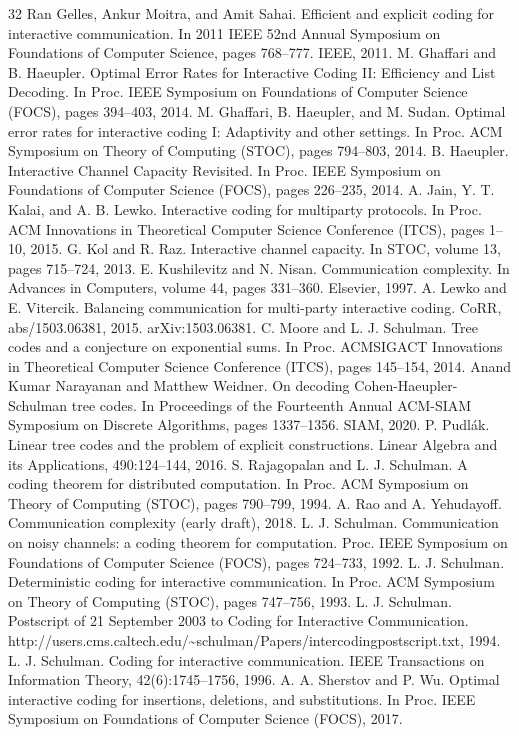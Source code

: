 \documentclass[10pt,a4paper]{article}
\begin{document}
\begin{thebibliography}{32}
 Ran Gelles, Ankur Moitra, and Amit Sahai. Efficient and explicit coding for interactive communication. In 2011 IEEE 52nd Annual Symposium on Foundations of Computer Science, pages 768–777. IEEE, 2011.
 M. Ghaffari and B. Haeupler. Optimal Error Rates for Interactive Coding II: Efficiency and List Decoding. In Proc. IEEE Symposium on Foundations of Computer Science (FOCS), pages 394–403, 2014.
 M. Ghaffari, B. Haeupler, and M. Sudan. Optimal error rates for interactive coding I: Adaptivity and other settings. In Proc. ACM Symposium on Theory of Computing (STOC), pages 794–803, 2014.
 B. Haeupler. Interactive Channel Capacity Revisited. In Proc. IEEE Symposium on Foundations of Computer Science (FOCS), pages 226–235, 2014.
 A. Jain, Y. T. Kalai, and A. B. Lewko. Interactive coding for multiparty protocols. In Proc. ACM Innovations in Theoretical Computer Science Conference (ITCS), pages 1–10, 2015.
 G. Kol and R. Raz. Interactive channel capacity. In STOC, volume 13, pages 715–724, 2013.
 E. Kushilevitz and N. Nisan. Communication complexity. In Advances in Computers, volume 44, pages 331–360. Elsevier, 1997.
 A. Lewko and E. Vitercik. Balancing communication for multi-party interactive coding. CoRR, abs/1503.06381, 2015. arXiv:1503.06381.
 C. Moore and L. J. Schulman. Tree codes and a conjecture on exponential sums. In Proc. ACMSIGACT Innovations in Theoretical Computer Science Conference (ITCS), pages 145–154, 2014.
 Anand Kumar Narayanan and Matthew Weidner. On decoding Cohen-Haeupler-Schulman tree codes. In Proceedings of the Fourteenth Annual ACM-SIAM Symposium on Discrete Algorithms, pages 1337–1356. SIAM, 2020.
 P. Pudlák. Linear tree codes and the problem of explicit constructions. Linear Algebra and its Applications, 490:124–144, 2016.
 S. Rajagopalan and L. J. Schulman. A coding theorem for distributed computation. In Proc. ACM Symposium on Theory of Computing (STOC), pages 790–799, 1994.
 A. Rao and A. Yehudayoff. Communication complexity (early draft), 2018.
 L. J. Schulman. Communication on noisy channels: a coding theorem for computation. Proc. IEEE Symposium on Foundations of Computer Science (FOCS), pages 724–733, 1992.
 L. J. Schulman. Deterministic coding for interactive communication. In Proc. ACM Symposium on Theory of Computing (STOC), pages 747–756, 1993.
 L. J. Schulman. Postscript of 21 September 2003 to Coding for Interactive Communication. http://users.cms.caltech.edu/\textasciitilde{}schulman/Papers/intercodingpostscript.txt, 1994.
 L. J. Schulman. Coding for interactive communication. IEEE Transactions on Information Theory, 42(6):1745–1756, 1996.
 A. A. Sherstov and P. Wu. Optimal interactive coding for insertions, deletions, and substitutions. In Proc. IEEE Symposium on Foundations of Computer Science (FOCS), 2017.
\end{thebibliography}
\end{document}

